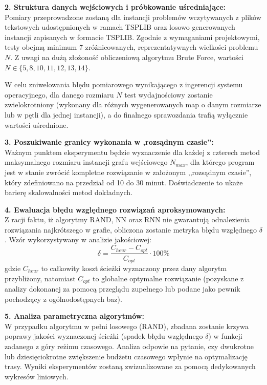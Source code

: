 \documentclass[12pt, a4paper]{article}
\begin{document}
	\vspace{1em}
	\noindent\textbf{2. Struktura danych wejściowych i próbkowanie uśredniające:} \\
	\indent Pomiary przeprowadzone zostaną dla instancji problemów wczytywanych z plików tekstowych udostępnionych w ramach TSPLIB oraz losowo generowanych instancji zapisanych w formacie TSPLIB. Zgodnie z wymaganiami projektowymi, testy obejmą minimum 7 zróżnicowanych, reprezentatywnych wielkości problemu $N$. Z uwagi na dużą złożoność obliczeniową algorytmu Brute Force, wartości $N \in \{5, 8, 10, 11, 12, 13, 14\}$.

	W celu zniwelowania błędu pomiarowego wynikającego z ingerencji systemu operacyjnego, dla danego rozmiaru $N$ test wydajnościowy zostanie zwielokrotniony (wykonany dla różnych wygenerowanych map o danym rozmiarze lub w pętli dla jednej instancji), a do finalnego sprawozdania trafią wyłącznie wartości uśrednione.
	
	\vspace{1em}
	\noindent\textbf{3. Poszukiwanie granicy wykonania w ,rozsądnym czasie'':} \\
	\indent Ważnym punktem eksperymentu będzie wyznaczenie dla każdej z czterech metod maksymalnego rozmiaru instancji grafu wejściowego $N_{max}$, dla którego program jest w stanie zwrócić kompletne rozwiązanie w założonym ,,rozsądnym czasie'', który zdefiniowano na przedział od 10 do 30 minut. Doświadczenie to ukaże barierę skalowalności metod dokładnych.
	
	\vspace{1em}
	\noindent\textbf{4. Ewaluacja błędu względnego rozwiązań aproksymowanych:} \\
	\indent Z racji faktu, iż algorytmy RAND, NN oraz RNN nie gwarantują odnalezienia rozwiązania najkrótszego w grafie, obliczona zostanie metryka błędu względnego $\delta$. Wzór wykorzystywany w analizie jakościowej:
	$$ \delta = \frac{C_{heur} - C_{opt}}{C_{opt}} \cdot 100\% $$
	gdzie $C_{heur}$ to całkowity koszt ścieżki wyznaczony przez dany algorytm przybliżony, natomiast $C_{opt}$ to globalne optymalne rozwiązanie (pozyskane z analizy dokonanej za pomocą przeglądu zupełnego lub podane jako pewnik pochodzący z ogólnodostępnych baz).
	
	\vspace{1em}
	\noindent\textbf{5. Analiza parametryczna algorytmów:} \\
	\indent W przypadku algorytmu w pełni losowego (RAND), zbadana zostanie krzywa poprawy jakości wyznaczonej ścieżki (spadek błędu względnego $\delta$) w funkcji zadanego z góry reżimu czasowego. Analiza odpowie na pytanie, czy dwukrotne lub dziesięciokrotne zwiększenie budżetu czasowego wpłynie na optymalizację trasy. Wyniki eksperymentów zostaną zwizualizowane za pomocą dedykowanych wykresów liniowych.
	
\end{document}
